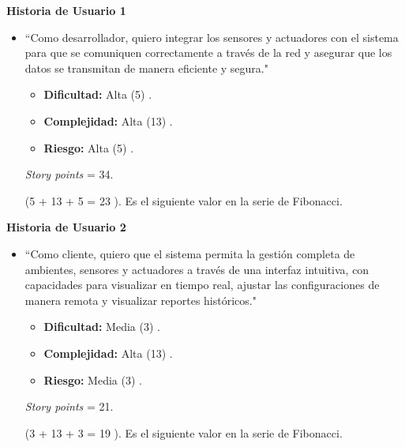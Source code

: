 \textbf{Historia de Usuario 1 }
\begin{itemize}
	\item ``Como desarrollador, quiero integrar los sensores y actuadores con el sistema para que se comuniquen correctamente a través de la
	      red y asegurar que los datos se transmitan de manera eficiente y segura."

	      \begin{itemize}
		      \item \textbf{Dificultad:} Alta (5) .
		      \item \textbf{Complejidad:} Alta (13) .
		      \item \textbf{Riesgo:} Alta (5) .
	      \end{itemize}

	      \textit{Story points} = 34.

	      (5 + 13 + 5 = 23 ). Es el siguiente valor en la serie de Fibonacci.

\end{itemize}

\textbf{Historia de Usuario 2 }
\begin{itemize}
	\item ``Como cliente, quiero que el sistema permita la gestión completa de ambientes, sensores y actuadores a través de una interfaz intuitiva,
	      con capacidades para visualizar en tiempo real, ajustar las configuraciones de manera remota y visualizar
	      reportes históricos."

	      \begin{itemize}
		      \item \textbf{Dificultad:} Media (3) .
		      \item \textbf{Complejidad:} Alta (13) .
		      \item \textbf{Riesgo:} Media (3) .
	      \end{itemize}

	      \textit{Story points} = 21.

	      (3 + 13 + 3 = 19 ). Es el siguiente valor en la serie de Fibonacci.

\end{itemize}


